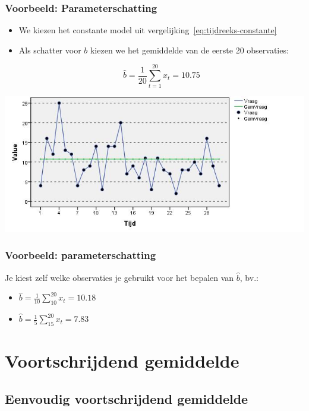 \documentclass{beamer}
\begin{document}
\begin{frame}
  \frametitle{Voorbeeld: Parameterschatting}

  \begin{itemize}
    \item We kiezen het constante model uit vergelijking~\ref{eq:tijdreeks-constante}
    \item Als schatter voor $b$ kiezen we het gemiddelde van de eerste 20 observaties:

      \[ \widehat{b} = \frac{1}{20} \sum_{t = 1}^{20} x_{t}= 10.75 \]

  \end{itemize}

  \centering
  \includegraphics[width=.7\textwidth]{img/tijdreeks21.jpg}
\end{frame}

\begin{frame}
  \frametitle{Voorbeeld: parameterschatting}

  Je kiest zelf welke observaties je gebruikt voor het bepalen van $\widehat{b}$, bv.:

  \begin{itemize}
    \item $\widehat{b} = \frac{1}{10} \sum_{10}^{20} x_{t} = 10.18$
    \item $\widehat{b} = \frac{1}{5} \sum_{15}^{20} x_{t} = 7.83$
  \end{itemize}

\end{frame}

\section{Voortschrijdend gemiddelde}

\subsection{Eenvoudig voortschrijdend gemiddelde}
\end{document}
